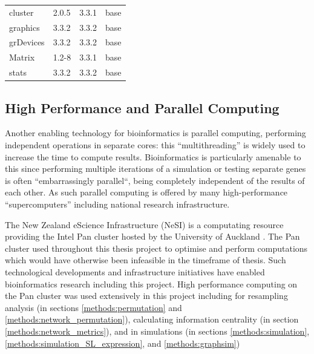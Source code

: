 \begin{longtable}{llll}
\rowcolor{black!10}
cluster      & 2.0.5          & 3.3.1 & base            \\
\rowcolor{black!5}
graphics     & 3.3.2          & 3.3.2 & base            \\
\rowcolor{black!10}
grDevices    & 3.3.2          & 3.3.2 & base            \\
\rowcolor{black!5}
Matrix       & 1.2-8          & 3.3.1 & base            \\
\rowcolor{black!10}
stats        & 3.3.2          & 3.3.2 & base            \\
\hline
\end{longtable}


\subsection{High Performance and Parallel Computing} \label{methods:HPC}
Another enabling technology for bioinformatics is parallel computing, performing independent operations in separate cores: this ``multithreading'' is widely used to increase the time to compute results. Bioinformatics is particularly amenable to this since performing multiple iterations of a simulation or testing separate genes is often ``embarrassingly parallel``, being completely independent of the results of each other. As such parallel computing is offered by many high-performance ``supercomputers'' including national research infrastructure.

The New Zealand eScience Infrastructure (NeSI) is a computating resource providing the Intel Pan cluster hosted by the University of Auckland \citep{NeSI}. The Pan cluster used throughout this thesis project to optimise and perform computations which would have otherwise been infeasible in the timeframe of thesis. Such technological developments and infrastructure initiatives have enabled bioinformatics research including this project.  High performance computing on the Pan cluster was used extensively in this project including for resampling analysis (in sections \ref{methods:permutation} and \ref{methods:network_permutation}), calculating information centrality (in section \ref{methods:network_metrics}), and in simulations (in sections \ref{methods:simulation}, \ref{methods:simulation_SL_expression}, and \ref{methods:graphsim})

